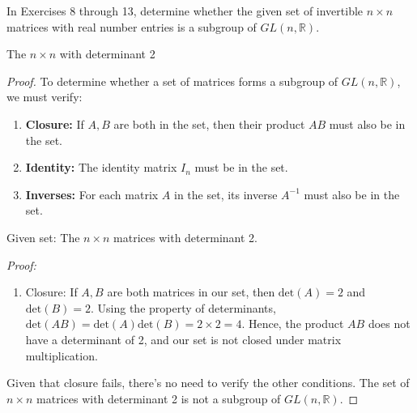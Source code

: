 \documentclass[12pt]{amsart}
\theoremstyle{definition}
\numberwithin{equation}{section}
\theoremstyle{plain}
\newcommand{\R}{\mathbb{R}}
\begin{document}
    \begin{exercise}{8}
        In Exercises 8 through 13, determine whether the given set of invertible $n \times n$ matrices with real number entries is a subgroup of $GL(n,\R)$.

        The $n \times n$ with determinant 2
    \begin{proof}
        To determine whether a set of matrices forms a subgroup of \( GL(n, \R) \), we must verify:

       \begin{enumerate}
        \item \textbf{Closure:} If \( A, B \) are both in the set, then their product \( AB \) must also be in the set.
        \item \textbf{Identity:} The identity matrix \( I_n \) must be in the set.
        \item \textbf{Inverses:} For each matrix \( A \) in the set, its inverse \( A^{-1} \) must also be in the set.
       \end{enumerate}
        Given set: The \( n \times n \) matrices with determinant 2.
        
        \textit{Proof:}
        
\begin{enumerate}
    \item Closure: If \( A, B \) are both matrices in our set, then \( \text{det}(A) = 2 \) and \( \text{det}(B) = 2 \). Using the property of determinants, \( \text{det}(AB) = \text{det}(A) \text{det}(B) = 2 \times 2 = 4 \). Hence, the product \( AB \) does not have a determinant of 2, and our set is not closed under matrix multiplication.
\end{enumerate}        
        Given that closure fails, there's no need to verify the other conditions. The set of \( n \times n \) matrices with determinant 2 is not a subgroup of \( GL(n, \R) \).
    \end{proof}
    \end{exercise}
            
\end{document}
